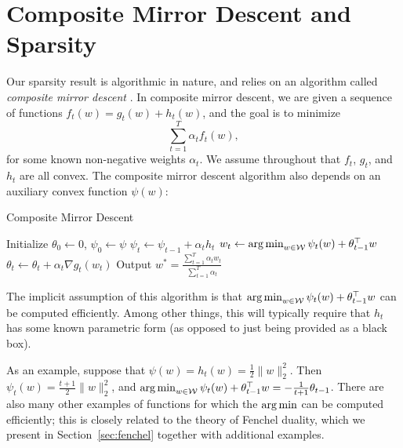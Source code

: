 \documentclass[paper.tex]{subfiles}
\begin{document}
\section{Composite Mirror Descent and Sparsity}
\label{sec:algorithm}

Our sparsity result is algorithmic in nature, and relies on an algorithm called 
\emph{composite mirror descent} \cite{comid}. In composite mirror descent, we 
are given a sequence of functions $f_t(w) = g_t(w) + h_t(w)$, and the goal is to 
minimize
\[ \sum_{t=1}^T \alpha_t f_t(w), \]
for some known non-negative weights $\alpha_t$. We assume throughout that $f_t$, 
$g_t$, and $h_t$ are all convex. The composite mirror descent algorithm also 
depends on an auxiliary convex function $\psi(w)$:
\begin{algorithm}
\caption{Composite Mirror Descent}
\label{alg:comid}
\begin{algorithmic}
\STATE Initialize $\theta_0 \gets 0$, $\psi_0 \gets \psi$
  \STATE $\psi_t \gets \psi_{t-1} + \alpha_t h_t$
  \STATE $w_t \gets \argmin_{w \in \W} \psi_{t}(w) + \theta_{t-1}^{\top} w$
  \STATE $\theta_t \gets \theta_t + \alpha_t \nabla g_t(w_t)$
\ENDFOR
\STATE Output $w^* = \frac{\sum_{t=1}^T \alpha_t w_t}{\sum_{t=1}^T \alpha_t}$
\end{algorithmic}
\end{algorithm}

The implicit assumption of this algorithm is that 
$\argmin_{w \in \W} \psi_t(w) + \theta_{t-1}^{\top}w$ can be computed efficiently. 
Among other things, this will typically require that $h_t$ has some known parametric 
form (as opposed to just being provided as a black box).

As an example, suppose that $\psi(w) = h_t(w) = \frac{1}{2}\|w\|_2^2$. Then 
$\psi_t(w) = \frac{t+1}{2}\|w\|_2^2$, and 
$\argmin_{w \in \W} \psi_t(w) + \theta_{t-1}^{\top} w = -\frac{1}{t+1}\theta_{t-1}$.
There are also many other examples of functions for which the $\argmin$ can be 
computed efficiently; this is closely related to the theory of Fenchel duality, 
which we present in Section~\ref{sec:fenchel} together with additional examples.
\end{document}
